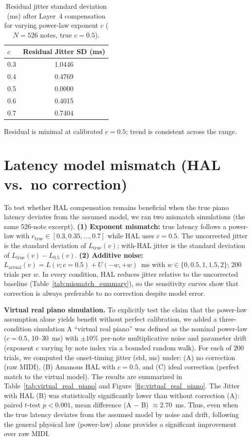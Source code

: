\documentclass[a4paper]{article}
\newcommand{\tbl}[2]{\caption{#1}\centering#2}
\newcommand{\tabnote}[1]{\par\vspace{0.5ex}\footnotesize#1}
\theoremstyle{definition}
\theoremstyle{remark}
\begin{document}
\begin{table}[htbp]
\tbl{Residual jitter standard deviation (ms) after Layer~4 compensation for varying power-law exponent $c$ ($N = 526$ notes, true $c = 0.5$).}
{\begin{tabular}{@{}lc@{}} \toprule
$c$ & \textbf{Residual Jitter SD (ms)} \\ \midrule
0.3 & 1.0446 \\
0.4 & 0.4769 \\
0.5 & 0.0000 \\
0.6 & 0.4015 \\
0.7 & 0.7404 \\ \bottomrule
\end{tabular}}
\tabnote{Residual is minimal at calibrated $c = 0.5$; trend is consistent across the range.}
\label{tab:sensitivity_powerlaw_c}
\end{table}


\section{Latency model mismatch (HAL vs.\ no correction)}
\label{app:latency_mismatch}

To test whether HAL compensation remains beneficial when the true piano latency deviates from the assumed model, we ran two mismatch simulations (the same 526-note excerpt). \textbf{(1) Exponent mismatch:} true latency follows a power-law with $c_{\mathrm{true}} \in [0.3, 0.35, \ldots, 0.7]$ while HAL uses $c = 0.5$. The uncorrected jitter is the standard deviation of $L_{\mathrm{true}}(v)$; with-HAL jitter is the standard deviation of $L_{\mathrm{true}}(v) - L_{0.5}(v)$. \textbf{(2) Additive noise:} $L_{\mathrm{actual}}(v) = L(v; c=0.5) + U(-w, +w)$~ms with $w \in \{0, 0.5, 1, 1.5, 2\}$; 200 trials per $w$. In every condition, HAL reduces jitter relative to the uncorrected baseline (Table~\ref{tab:mismatch_summary}), so the sensitivity curves show that correction is always preferable to no correction despite model error. 

\textbf{Virtual real piano simulation.} To explicitly test the claim that the power-law assumption alone yields benefit without perfect calibration, we added a three-condition simulation  A ``virtual real piano'' was defined as the nominal power-law ($c = 0.5$, 10--30~ms) with $\pm 10\%$ per-note multiplicative noise and parameter drift (exponent $c$ varying by note index via a bounded random walk). For each of 200 trials, we computed the onset-timing jitter (std, ms) under: (A) no correction (raw MIDI), (B) Amanous HAL with $c = 0.5$, and (C) ideal correction (perfect match to the virtual model). The results are summarized in Table~\ref{tab:virtual_real_piano} and Figure~\ref{fig:virtual_real_piano}. The Jitter with HAL (B) was statistically significantly lower than without correction (A): paired $t$-test $p < 0.001$, mean difference (A $-$ B) $\approx 2.70$~ms. Thus, even when the true latency deviates from the assumed model by noise and drift, following the general physical law (power-law) alone provides a significant improvement over raw MIDI.
\end{document}
